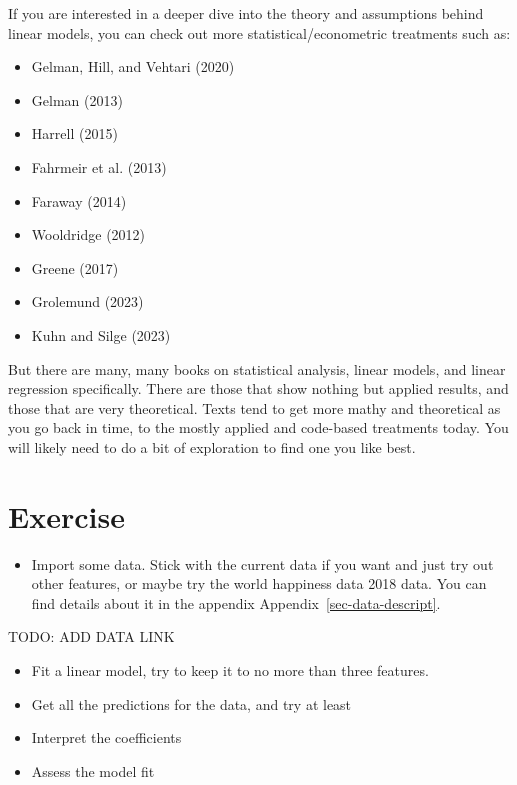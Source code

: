 \documentclass[
  letterpaper,
]{krantz}
\providecommand{\tightlist}{%
  \setlength{\itemsep}{0pt}\setlength{\parskip}{0pt}}\usepackage{longtable,booktabs,array}
\begin{document}
If you are interested in a deeper dive into the theory and assumptions
behind linear models, you can check out more statistical/econometric
treatments such as:

\begin{itemize}
\tightlist
\item
  Gelman, Hill, and Vehtari (2020)
\item
  Gelman (2013)
\item
  Harrell (2015)
\item
  Fahrmeir et al. (2013)
\item
  Faraway (2014)
\item
  Wooldridge (2012)
\item
  Greene (2017)
\item
  Grolemund (2023)
\item
  Kuhn and Silge (2023)
\end{itemize}

But there are many, many books on statistical analysis, linear models,
and linear regression specifically. There are those that show nothing
but applied results, and those that are very theoretical. Texts tend to
get more mathy and theoretical as you go back in time, to the mostly
applied and code-based treatments today. You will likely need to do a
bit of exploration to find one you like best.

\section{Exercise}\label{sec-lm-exercise}

\begin{itemize}
\tightlist
\item
  Import some data. Stick with the current data if you want and just try
  out other features, or maybe try the world happiness data 2018 data.
  You can find details about it in the appendix
  Appendix~\ref{sec-data-descript}.
\end{itemize}

TODO: ADD DATA LINK

\begin{itemize}
\tightlist
\item
  Fit a linear model, try to keep it to no more than three features.
\item
  Get all the predictions for the data, and try at least
\item
  Interpret the coefficients
\item
  Assess the model fit
\end{itemize}
\end{document}
